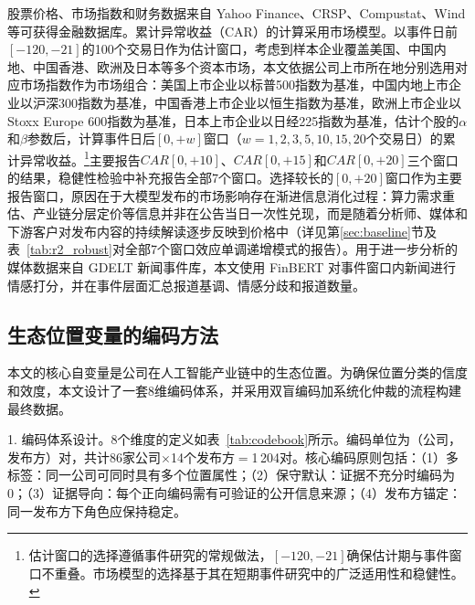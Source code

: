 \documentclass[11pt,fontset=fandol,a4paper]{ctexart}
\newcommand{\changed}[1]{#1}
\newcommand{\revise}[1]{#1}
\begin{document}
\changed{股票价格、市场指数和财务数据来自 Yahoo Finance、CRSP、Compustat、Wind 等可获得金融数据库。累计异常收益（CAR）的计算采用市场模型。以事件日前$[-120,-21]$的100个交易日作为估计窗口，\revise{考虑到样本企业覆盖美国、中国内地、中国香港、欧洲及日本等多个资本市场，本文依据公司上市所在地分别选用对应市场指数作为市场组合：美国上市企业以标普500指数为基准，中国内地上市企业以沪深300指数为基准，中国香港上市企业以恒生指数为基准，欧洲上市企业以Stoxx Europe 600指数为基准，日本上市企业以日经225指数为基准}，估计个股的$\alpha$和$\beta$参数后，计算事件日后$[0,+w]$窗口（$w=1,2,3,5,10,15,20$个交易日）的累计异常收益。\footnote{估计窗口的选择遵循事件研究的常规做法，$[-120,-21]$确保估计期与事件窗口不重叠。市场模型的选择基于其在短期事件研究中的广泛适用性和稳健性。}主要报告$CAR[0,+10]$、$CAR[0,+15]$和$CAR[0,+20]$三个窗口的结果，稳健性检验中补充报告全部7个窗口。\revise{选择较长的$[0,+20]$窗口作为主要报告窗口，原因在于大模型发布的市场影响存在渐进信息消化过程：算力需求重估、产业链分层定价等信息并非在公告当日一次性兑现，而是随着分析师、媒体和下游客户对发布内容的持续解读逐步反映到价格中（详见第\ref{sec:baseline}节及表~\ref{tab:r2_robust}对全部7个窗口效应单调递增模式的报告）。}用于进一步分析的媒体数据来自 GDELT 新闻事件库，本文使用 FinBERT 对事件窗口内新闻进行情感打分，并在事件层面汇总报道基调、情感分歧和报道数量。}

\subsection{生态位置变量的编码方法}

本文的核心自变量是公司在人工智能产业链中的生态位置。为确保位置分类的信度和效度，本文设计了一套8维编码体系，并采用双盲编码加系统化仲裁的流程构建最终数据。

1. 编码体系设计。8个维度的定义如表~\ref{tab:codebook}所示。编码单位为（公司，发布方）对，共计86家公司$\times$14个发布方$=$1\,204对。核心编码原则包括：（1）多标签：同一公司可同时具有多个位置属性；（2）保守默认：证据不充分时编码为0；（3）证据导向：每个正向编码需有可验证的公开信息来源；（4）发布方锚定：同一发布方下角色应保持稳定。
\end{document}
